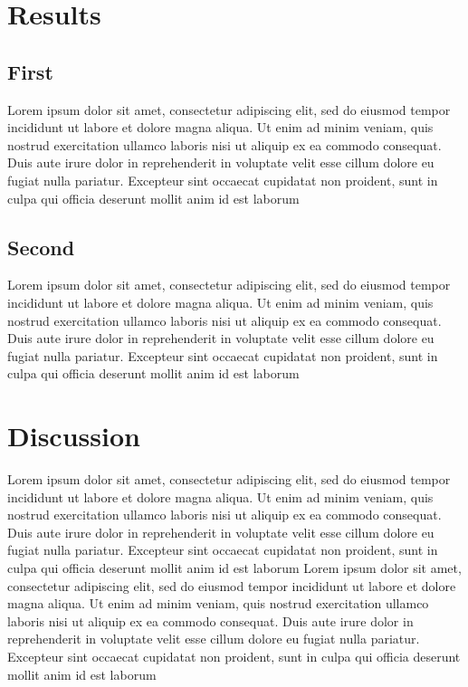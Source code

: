 \documentclass[twoside,twocolumn]{article}                          %
\begin{document}
\section{Results}
\subsection{First}
Lorem ipsum dolor sit amet, consectetur adipiscing elit, sed do eiusmod tempor incididunt ut labore et dolore magna aliqua. Ut enim ad minim veniam, quis nostrud exercitation ullamco laboris nisi ut aliquip ex ea commodo consequat. Duis aute irure dolor in reprehenderit in voluptate velit esse cillum dolore eu fugiat nulla pariatur. Excepteur sint occaecat cupidatat non proident, sunt in culpa qui officia deserunt mollit anim id est laborum
\subsection{Second}
Lorem ipsum dolor sit amet, consectetur adipiscing elit, sed do eiusmod tempor incididunt ut labore et dolore magna aliqua. Ut enim ad minim veniam, quis nostrud exercitation ullamco laboris nisi ut aliquip ex ea commodo consequat. Duis aute irure dolor in reprehenderit in voluptate velit esse cillum dolore eu fugiat nulla pariatur. Excepteur sint occaecat cupidatat non proident, sunt in culpa qui officia deserunt mollit anim id est laborum

\section{Discussion}
Lorem ipsum dolor sit amet, consectetur adipiscing elit, sed do eiusmod tempor incididunt ut labore et dolore magna aliqua. Ut enim ad minim veniam, quis nostrud exercitation ullamco laboris nisi ut aliquip ex ea commodo consequat. Duis aute irure dolor in reprehenderit in voluptate velit esse cillum dolore eu fugiat nulla pariatur. Excepteur sint occaecat cupidatat non proident, sunt in culpa qui officia deserunt mollit anim id est laborum
Lorem ipsum dolor sit amet, consectetur adipiscing elit, sed do eiusmod tempor incididunt ut labore et dolore magna aliqua. Ut enim ad minim veniam, quis nostrud exercitation ullamco laboris nisi ut aliquip ex ea commodo consequat. Duis aute irure dolor in reprehenderit in voluptate velit esse cillum dolore eu fugiat nulla pariatur. Excepteur sint occaecat cupidatat non proident, sunt in culpa qui officia deserunt mollit anim id est laborum
\end{document}
